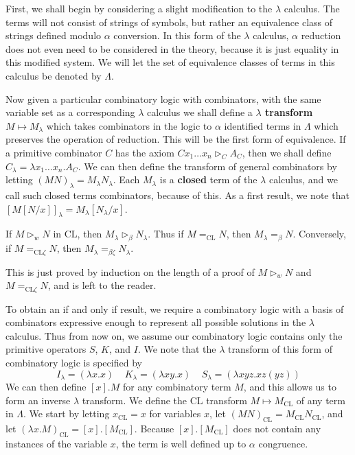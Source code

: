 First, we shall begin by considering a slight modification to the $\lambda$ calculus. The terms will not consist of strings of symbols, but rather an equivalence class of strings defined modulo $\alpha$ conversion. In this form of the $\lambda$ calculus, $\alpha$ reduction does not even need to be considered in the theory, because it is just equality in this modified system. We will let the set of equivalence classes of terms in this calculus be denoted by $\Lambda$.

Now given a particular combinatory logic with combinators, with the same variable set as a corresponding $\lambda$ calculus we shall define a {\bf $\lambda$ transform} $M \mapsto M_\lambda$ which takes combinators in the logic to $\alpha$ identified terms in $\Lambda$ which preserves the operation of reduction. This will be the first form of equivalence. If a primitive combinator $C$ has the axiom $Cx_1 \dots x_n \rhd_C A_C$, then we shall define $C_\lambda = \lambda x_1 \dots x_n. A_C$. We can then define the transform of general combinators by letting $(MN)_\lambda = M_\lambda N_\lambda$. Each $M_\lambda$ is a {\bf closed} term of the $\lambda$ calculus, and we call such closed terms combinators, because of this. As a first result, we note that $[M[N/x]]_\lambda = M_\lambda [N_\lambda/x]$.

\begin{lemma}
    If $M \rhd_w N$ in $\text{CL}$, then $M_\lambda \rhd_\beta N_\lambda$. Thus if $M =_{\text{CL}} N$, then $M_\lambda =_\beta N$. Conversely, if $M =_{\text{CL} \zeta} N$, then $M_\lambda =_{\beta \zeta} N_\lambda$.
\end{lemma}

This is just proved by induction on the length of a proof of $M \rhd_w N$ and $M =_{\text{CL} \zeta} N$, and is left to the reader.

To obtain an if and only if result, we require a combinatory logic with a basis of combinators expressive enough to represent all possible solutions in the $\lambda$ calculus. Thus from now on, we assume our combinatory logic contains only the primitive operators $S$, $K$, and $I$. We note that the $\lambda$ transform of this form of combinatory logic is specified by
%
\[ I_\lambda = (\lambda x.x)\ \ \ \ \ K_\lambda = (\lambda xy.x)\ \ \ \ \ S_\lambda = (\lambda xyz.xz(yz)) \]
%
We can then define $[x].M$ for any combinatory term $M$, and this allows us to form an inverse $\lambda$ transform. We define the $\text{CL}$ transform $M \mapsto M_{\text{CL}}$ of any term in $\Lambda$. We start by letting $x_{\text{CL}} = x$ for variables $x$, let $(MN)_{\text{CL}} = M_{\text{CL}} N_{\text{CL}}$, and let $(\lambda x.M)_{\text{CL}} = [x].[M_{\text{CL}}]$. Because $[x].[M_{\text{CL}}]$ does not contain any instances of the variable $x$, the term is well defined up to $\alpha$ congruence.

